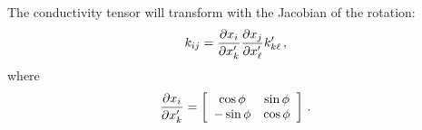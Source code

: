 \documentclass[main.tex]{subfiles}
\begin{document}
The conductivity tensor will transform with the Jacobian of the rotation: 
%
\begin{align}
k_{ij} = \pdv{x_i}{x'_k} \pdv{x_j}{x'_\ell} k'_{k \ell}
\,,
\end{align}
%
where 
%
\begin{align}
\pdv{x_i}{x'_k} = \left[\begin{array}{cc}
\cos \phi  & \sin \phi  \\ 
- \sin \phi & \cos \phi 
\end{array}\right]
\,.
\end{align}

\end{document}
